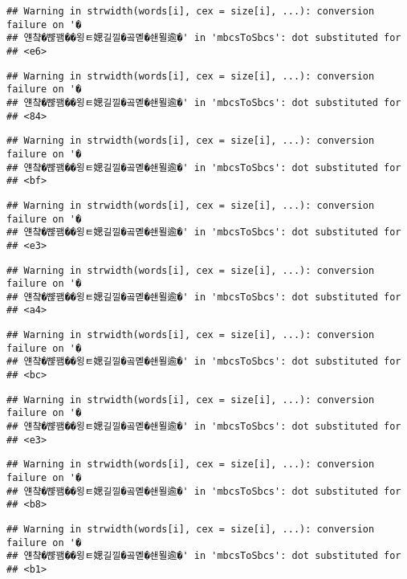 \documentclass[]{article}
\begin{document}
\begin{verbatim}
## Warning in strwidth(words[i], cex = size[i], ...): conversion failure on '�
## 얜챸�뺞꽴��욍ㅌ媤길낄�곸몓�쇈묄逾�' in 'mbcsToSbcs': dot substituted for
## <e6>
\end{verbatim}

\begin{verbatim}
## Warning in strwidth(words[i], cex = size[i], ...): conversion failure on '�
## 얜챸�뺞꽴��욍ㅌ媤길낄�곸몓�쇈묄逾�' in 'mbcsToSbcs': dot substituted for
## <84>
\end{verbatim}

\begin{verbatim}
## Warning in strwidth(words[i], cex = size[i], ...): conversion failure on '�
## 얜챸�뺞꽴��욍ㅌ媤길낄�곸몓�쇈묄逾�' in 'mbcsToSbcs': dot substituted for
## <bf>
\end{verbatim}

\begin{verbatim}
## Warning in strwidth(words[i], cex = size[i], ...): conversion failure on '�
## 얜챸�뺞꽴��욍ㅌ媤길낄�곸몓�쇈묄逾�' in 'mbcsToSbcs': dot substituted for
## <e3>
\end{verbatim}

\begin{verbatim}
## Warning in strwidth(words[i], cex = size[i], ...): conversion failure on '�
## 얜챸�뺞꽴��욍ㅌ媤길낄�곸몓�쇈묄逾�' in 'mbcsToSbcs': dot substituted for
## <a4>
\end{verbatim}

\begin{verbatim}
## Warning in strwidth(words[i], cex = size[i], ...): conversion failure on '�
## 얜챸�뺞꽴��욍ㅌ媤길낄�곸몓�쇈묄逾�' in 'mbcsToSbcs': dot substituted for
## <bc>
\end{verbatim}

\begin{verbatim}
## Warning in strwidth(words[i], cex = size[i], ...): conversion failure on '�
## 얜챸�뺞꽴��욍ㅌ媤길낄�곸몓�쇈묄逾�' in 'mbcsToSbcs': dot substituted for
## <e3>
\end{verbatim}

\begin{verbatim}
## Warning in strwidth(words[i], cex = size[i], ...): conversion failure on '�
## 얜챸�뺞꽴��욍ㅌ媤길낄�곸몓�쇈묄逾�' in 'mbcsToSbcs': dot substituted for
## <b8>
\end{verbatim}

\begin{verbatim}
## Warning in strwidth(words[i], cex = size[i], ...): conversion failure on '�
## 얜챸�뺞꽴��욍ㅌ媤길낄�곸몓�쇈묄逾�' in 'mbcsToSbcs': dot substituted for
## <b1>
\end{verbatim}
\end{document}
